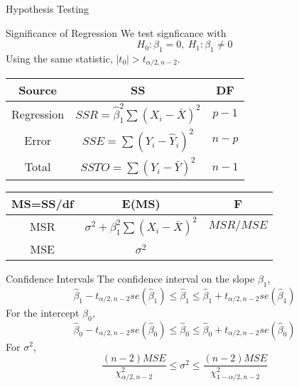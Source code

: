 \documentclass{article}
\begin{document}
\begin{multicols*}{3}
\begin{blackbox}{Hypothesis Testing}
    \end{blackbox}
    \begin{blackbox}{Significance of Regression}
        We test signficance with 
        \[H_0: \beta_1 = 0, \ H_1: \beta_1 \neq 0\]
        Using the same statistic, $|t_0| > t_{\alpha/2, n-2}$. 
        \renewcommand{\arraystretch}{1.5}
        \begin{center}
            \begin{tabular}{|c|c|c|}
                \hline
                Source & SS & DF \\
                \hline
                \hline
                Regression & $SSR = \hat{\beta}_1^2\sum(X_i-\bar{X})^2$ & $p-1$ \\
                \hline
                Error & $SSE=\sum(Y_i - \hat{Y}_i)^2$ & $n-p$\\
                \hline 
                Total & $SSTO =\sum(Y_i - \bar{Y})^2$ & $n-1$\\
                \hline
            \end{tabular}
        \end{center}
        \begin{center}
            \begin{tabular}{|c|c|c|}
                \hline
                MS=SS/df & E(MS) & F\\
                \hline
                \hline
                MSR & $\sigma^2 + \beta_1^2\sum(X_i - \bar{X})^2$ & $MSR/MSE$\\
                \hline
                MSE &  $\sigma^2$ &\\
                \hline 
            \end{tabular}
        \end{center}
    \end{blackbox}
    \begin{blackbox}{Confidence Intervals}
        The confidence interval on the slope $\beta_1$,\\[-1ex]
        \[\hat{\beta}_1 - t_{\alpha/2, n-2}se(\hat{\beta}_1) \leq \hat{\beta}_1 \leq \hat{\beta}_1 + t_{\alpha/2, n-2}se(\hat{\beta}_1)\]
        For the intercept $\beta_0$,\\[-1ex]
        \[\hat{\beta}_0 - t_{\alpha/2, n-2}se(\hat{\beta}_0) \leq \hat{\beta}_0 \leq \hat{\beta}_0 + t_{\alpha/2, n-2}se(\hat{\beta}_0)\]
        For $\sigma^2$, \\[-4ex]
        \[\frac{(n-2)MSE}{\chi^2_{\alpha/2, n-2}} \leq \sigma^2 \leq \frac{(n-2)MSE}{\chi^2_{1-\alpha/2, n-2}}\]

\end{blackbox}
\end{multicols*}
\end{document}
